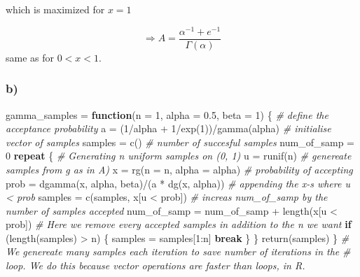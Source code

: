 \documentclass[
]{article}
\newenvironment{Shaded}{\begin{snugshade}}{\end{snugshade}}
\newcommand{\AttributeTok}[1]{\textcolor[rgb]{0.77,0.63,0.00}{#1}}
\newcommand{\CommentTok}[1]{\textcolor[rgb]{0.56,0.35,0.01}{\textit{#1}}}
\newcommand{\ControlFlowTok}[1]{\textcolor[rgb]{0.13,0.29,0.53}{\textbf{#1}}}
\newcommand{\DecValTok}[1]{\textcolor[rgb]{0.00,0.00,0.81}{#1}}
\newcommand{\FloatTok}[1]{\textcolor[rgb]{0.00,0.00,0.81}{#1}}
\newcommand{\FunctionTok}[1]{\textcolor[rgb]{0.00,0.00,0.00}{#1}}
\newcommand{\NormalTok}[1]{#1}
\newcommand{\OtherTok}[1]{\textcolor[rgb]{0.56,0.35,0.01}{#1}}
\newcommand{\SpecialCharTok}[1]{\textcolor[rgb]{0.00,0.00,0.00}{#1}}
\begin{document}
which is maximized for \(x = 1\)

\[
\Longrightarrow A = \frac{\alpha^{-1} + e^{-1}}{\Gamma(\alpha)}
\] same as for \(0 < x < 1\).

\hypertarget{b}{%
\subsubsection{b)}\label{b}}

\begin{Shaded}
\begin{Highlighting}[]
\NormalTok{gamma\_samples }\OtherTok{=} \ControlFlowTok{function}\NormalTok{(}\AttributeTok{n =} \DecValTok{1}\NormalTok{, }\AttributeTok{alpha =} \FloatTok{0.5}\NormalTok{, }\AttributeTok{beta =} \DecValTok{1}\NormalTok{) \{}
    \CommentTok{\# define the acceptance probability}
\NormalTok{    a }\OtherTok{=}\NormalTok{ (}\DecValTok{1}\SpecialCharTok{/}\NormalTok{alpha }\SpecialCharTok{+} \DecValTok{1}\SpecialCharTok{/}\FunctionTok{exp}\NormalTok{(}\DecValTok{1}\NormalTok{))}\SpecialCharTok{/}\FunctionTok{gamma}\NormalTok{(alpha)}
    \CommentTok{\# initialise vector of samples}
\NormalTok{    samples }\OtherTok{=} \FunctionTok{c}\NormalTok{()}
    \CommentTok{\# number of succesful samples}
\NormalTok{    num\_of\_samp }\OtherTok{=} \DecValTok{0}
    \ControlFlowTok{repeat}\NormalTok{ \{}
        \CommentTok{\# Generating n uniform samples on (0, 1)}
\NormalTok{        u }\OtherTok{=} \FunctionTok{runif}\NormalTok{(n)}
        \CommentTok{\# genereate samples from g as in A)}
\NormalTok{        x }\OtherTok{=} \FunctionTok{rg}\NormalTok{(}\AttributeTok{n =}\NormalTok{ n, }\AttributeTok{alpha =}\NormalTok{ alpha)}
        \CommentTok{\# probability of accepting}
\NormalTok{        prob }\OtherTok{=} \FunctionTok{dgamma}\NormalTok{(x, alpha, beta)}\SpecialCharTok{/}\NormalTok{(a }\SpecialCharTok{*} \FunctionTok{dg}\NormalTok{(x, alpha))}
        \CommentTok{\# appending the x{-}s where u \textless{} prob}
\NormalTok{        samples }\OtherTok{=} \FunctionTok{c}\NormalTok{(samples, x[u }\SpecialCharTok{\textless{}}\NormalTok{ prob])}
        \CommentTok{\# increas num\_of\_samp by the number of samples accepted}
\NormalTok{        num\_of\_samp }\OtherTok{=}\NormalTok{ num\_of\_samp }\SpecialCharTok{+} \FunctionTok{length}\NormalTok{(x[u }\SpecialCharTok{\textless{}}\NormalTok{ prob])}
        \CommentTok{\# Here we remove every accepted samples in addition to the n we want}
        \ControlFlowTok{if}\NormalTok{ (}\FunctionTok{length}\NormalTok{(samples) }\SpecialCharTok{\textgreater{}}\NormalTok{ n) \{}
\NormalTok{            samples }\OtherTok{=}\NormalTok{ samples[}\DecValTok{1}\SpecialCharTok{:}\NormalTok{n]}
            \ControlFlowTok{break}
\NormalTok{        \}}
\NormalTok{    \}}
    \FunctionTok{return}\NormalTok{(samples)}
\NormalTok{\}}
\CommentTok{\# We genereate many samples each iteration to save number of iterations in the}
\CommentTok{\# loop. We do this because vector operations are faster than loops, in R.}
\end{Highlighting}
\end{Shaded}
\end{document}
